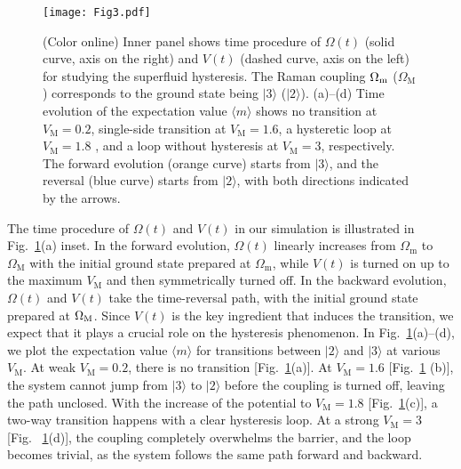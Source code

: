 \documentclass[twocolumn,prl,floatfix,citeautoscript,nofootinbib]{revtex4-1}
\begin{document}
\begin{figure}[t]
\centering
\texttt{[image: Fig3.pdf]}
\caption{(Color online) Inner panel shows time procedure of $\Omega (t)$
(solid curve, axis on the right) and $V(t)$ (dashed curve, axis on the left)
for studying the superfluid hysteresis. The Raman coupling $\Omega _{\mathrm{%
m}}$ ($\Omega _{\mathrm{M}}$) corresponds to the ground state being $%
|3\rangle $ ($|2\rangle $). (a)--(d) Time evolution of the expectation value
$\langle m\rangle $ shows no transition at $V_{\mathrm{M}}=0.2$, single-side
transition at $V_{\mathrm{M}}=1.6$, a hysteretic loop at $V_{\mathrm{M}}=1.8$%
, and a loop without hysteresis at $V_{\mathrm{M}}=3$, respectively. The
forward evolution (orange curve) starts from $|3\rangle $, and the reversal
(blue curve) starts from $|2\rangle $, with both directions indicated by the
arrows.}
\label{fig3}
\end{figure}

The time procedure of $\Omega (t)$ and $V(t)$ in our simulation is
illustrated in Fig.~\ref{fig3}(a) inset. In the forward evolution, $\Omega
(t)$ linearly increases from $\Omega _{\mathrm{m}}$ to $\Omega _{\mathrm{M}}$
with the initial ground state prepared at $\Omega _{\mathrm{m}}$, while $V(t)
$ is turned on up to the maximum $V_{\mathrm{M}}$ and then symmetrically
turned off. In the backward evolution, $\Omega (t)$ and $V(t)$ take the
time-reversal path, with the initial ground state prepared at $\Omega _{%
\mathrm{M}}$. Since $V(t)$ is the key ingredient that induces the
transition, we expect that it plays a crucial role on the hysteresis
phenomenon. In Fig.~\ref{fig3}(a)--(d), we plot the expectation value $%
\langle m\rangle $ for transitions between $|2\rangle $ and $|3\rangle $ at
various $V_{\mathrm{M}}$. At weak $V_{\mathrm{M}}=0.2$, there is no
transition [Fig.~\ref{fig3}(a)]. At $V_{\mathrm{M}}=1.6$ [Fig.~\ref{fig3}%
(b)], the system cannot jump from $|3\rangle $ to $|2\rangle $ before the
coupling is turned off, leaving the path unclosed. With the increase of the
potential to $V_{\mathrm{M}}=1.8$ [Fig.~\ref{fig3}(c)], a two-way transition
happens with a clear hysteresis loop. At a strong $V_{\mathrm{M}}=3$ [Fig.~%
\ref{fig3}(d)], the coupling completely overwhelms the barrier, and the loop
becomes trivial, as the system follows the same path forward and backward.
\end{document}
